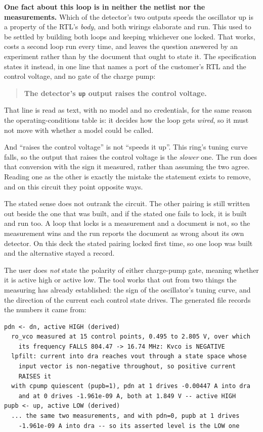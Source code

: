 \documentclass[11pt,a4paper]{article}
\begin{document}
\noindent\textbf{One fact about this loop is in neither the netlist
nor the measurements.} Which of the detector's two outputs speeds the
oscillator up is a property of the RTL's \emph{body}, and both wirings
elaborate and run. This used to be settled by building both loops and
keeping whichever one locked. That works, costs a second loop run
every time, and leaves the question answered by an experiment rather
than by the document that ought to state it. The specification states
it instead, in one line that names a port of the customer's RTL and
the control voltage, and no gate of the charge pump:

\begin{quote}
\textbf{The detector's \texttt{up} output raises the control voltage.}
\end{quote}

\noindent That line is read as text, with no model and no
credentials, for the same reason the operating-conditions table is: it
decides how the loop gets \emph{wired}, so it must not move with
whether a model could be called.

And ``raises the control voltage'' is not ``speeds it up''. This
ring's tuning curve falls, so the output that raises the control
voltage is the \emph{slower} one. The run does that conversion with
the sign it measured, rather than assuming the two agree. Reading one
as the other is exactly the mistake the statement exists to remove,
and on this circuit they point opposite ways.

The stated sense does not outrank the circuit. The other pairing is
still written out beside the one that was built, and if the stated one
fails to lock, it is built and run too. A loop that locks is a
measurement and a document is not, so the measurement wins and the run
reports the document as wrong about its own detector. On this deck the
stated pairing locked first time, so one loop was built and the
alternative stayed a record.

The user does \emph{not} state the polarity of either charge-pump
gate, meaning whether it is active high or active low. The tool works
that out from two things the measuring has already established: the
sign of the oscillator's tuning curve, and the direction of the
current each control state drives. The generated file records the
numbers it came from:

\begin{lstlisting}
pdn <- dn, active HIGH (derived)
  ro_vco measured at 15 control points, 0.495 to 2.805 V, over which
    its frequency FALLS 804.47 -> 16.74 MHz: Kvco is NEGATIVE
  lpfilt: current into dra reaches vout through a state space whose
    input vector is non-negative throughout, so positive current
    RAISES it
  with cpump quiescent (pupb=1), pdn at 1 drives -0.00447 A into dra
    and at 0 drives -1.961e-09 A, both at 1.849 V -- active HIGH
pupb <- up, active LOW (derived)
  ... the same two measurements, and with pdn=0, pupb at 1 drives
    -1.961e-09 A into dra -- so its asserted level is the LOW one
\end{lstlisting}
\end{document}

